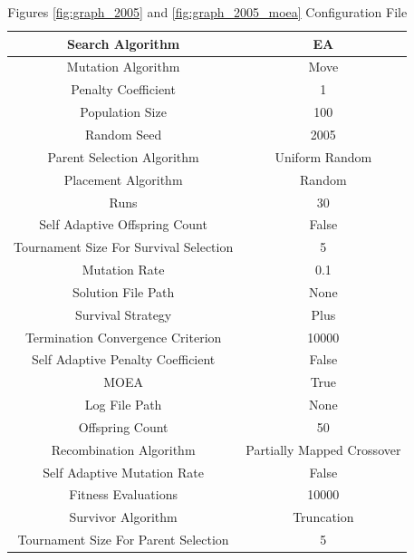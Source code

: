 \documentclass{standalone}
\begin{document}
\begin{table}[!htb]
	\centering
	\caption{Figures \ref{fig:graph_2005} and \ref{fig:graph_2005_moea} Configuration File}
	\label{tab:graph_2005}
	\begin{tabular}{| c | c |}
		\hline
		Search Algorithm		& EA		 \\
		\hline
		Mutation Algorithm		& Move		 \\
		\hline
		Penalty Coefficient		& 1		 \\
		\hline
		Population Size		& 100		 \\
		\hline
		Random Seed		& 2005		 \\
		\hline
		Parent Selection Algorithm		& Uniform Random		 \\
		\hline
		Placement Algorithm		& Random		 \\
		\hline
		Runs		& 30		 \\
		\hline
		Self Adaptive Offspring Count		& False		 \\
		\hline
		Tournament Size For Survival Selection		& 5		 \\
		\hline
		Mutation Rate		& 0.1		 \\
		\hline
		Solution File Path		& None		 \\
		\hline
		Survival Strategy		& Plus		 \\
		\hline
		Termination Convergence Criterion		& 10000		 \\
		\hline
		Self Adaptive Penalty Coefficient		& False		 \\
		\hline
		MOEA		& True		 \\
		\hline
		Log File Path		& None		 \\
		\hline
		Offspring Count		& 50		 \\
		\hline
		Recombination Algorithm		& Partially Mapped Crossover		 \\
		\hline
		Self Adaptive Mutation Rate		& False		 \\
		\hline
		Fitness Evaluations		& 10000		 \\
		\hline
		Survivor Algorithm		& Truncation		 \\
		\hline
		Tournament Size For Parent Selection		& 5		 \\
		\hline
	\end{tabular}
\end{table}
\end{document}
